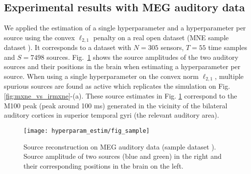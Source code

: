 \subsection{Experimental results with MEG auditory data}

We applied the estimation of a single hyperparameter and a hyperparameter per source using the convex $\ell_{2,1}$ penalty on a real open dataset (MNE sample dataset \cite{MNE}). It corresponds to a dataset with $N=305$ sensors, $T=55$ time samples and $S=7498$ sources. 
Fig.~\ref{fig:sample_data} shows the source amplitudes of the two auditory sources and their positions in the brain when estimating a hyperparameter per source. When using a single hyperparameter on the convex norm $\ell_{2,1}$, multiple spurious sources are found as active which replicates the simulation on Fig.\ref{fig:mxne_vs_irmxne}-(a). These source estimates in Fig. \ref{fig:sample_data} correspond to the M100 peak (peak around 100 ms) generated in the vicinity of the bilateral auditory cortices in superior temporal gyri (the relevant auditory area).


\begin{figure}
\texttt{[image: hyperparam\_estim/fig\_sample]}
    \caption{Source reconstruction on MEG auditory data (sample dataset \cite{MNE}). Source amplitude of two sources (blue and green) in the right and their corresponding positions in the brain on the left. 
    }
    \label{fig:sample_data}
\end{figure}

